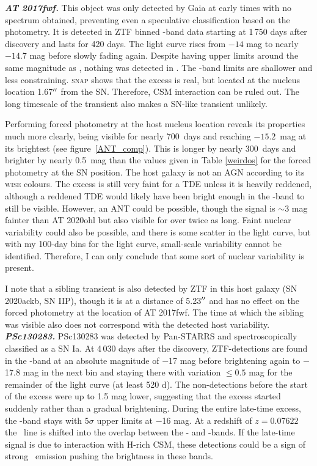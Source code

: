 \documentclass[a4paper,oneside,12pt, class=Latex/Classes/PhDthesisPSnPDF, crop=false]{standalone}
\begin{document}
\textit{\textbf{AT 2017fwf.}}
This object was only detected by Gaia at early times with no spectrum obtained, preventing even a speculative classification based on the photometry. It is detected in ZTF binned \ztfr-band data starting at 1\,750 days after discovery and lasts for 420 days. The light curve rises from $-14$ mag to nearly $-14.7$ mag before slowly fading again. Despite having upper limits around the same magnitude as \ztfr, nothing was detected in \ztfg. The \ztfi-band limits are shallower and less constraining. \textsc{snap} shows that the excess is real, but located at the nucleus location 1.67$^{\prime\prime}$ from the SN. Therefore, CSM interaction can be ruled out. The long timescale of the transient also makes a SN-like transient unlikely.

Performing forced photometry at the host nucleus location reveals its properties much more clearly, being visible for nearly 700~days and reaching $-15.2$~mag at its brightest (see figure~\ref{ANT_comp}). This is longer by nearly 300~days and brighter by nearly 0.5~mag than the values given in Table \ref{weirdos} for the forced photometry at the SN position. The host galaxy is not an AGN according to its \textsc{wise} colours. The excess is still very faint for a TDE unless it is heavily reddened, although a reddened TDE would likely have been bright enough in the \ztfi-band to still be visible. However, an ANT could be possible, though the signal is $\sim3$ mag fainter than AT 2020ohl but also visible for over twice as long. Faint nuclear variability could also be possible, and there is some scatter in the light curve, but with my 100-day bins for the light curve, small-scale variability cannot be identified. Therefore, I can only conclude that some sort of nuclear variability is present.

I note that a sibling transient is also detected by ZTF in this host galaxy (SN 2020ackb, SN IIP), though it is at a distance of 5.23$^{\prime\prime}$ and has no effect on the forced photometry at the location of AT 2017fwf. The time at which the sibling was visible also does not correspond with the detected host variability.\\


\textit{\textbf{PSc130283.}}
PSc130283 was detected by Pan-STARRS and spectroscopically classified as a SN Ia. At 4\,030 days after the discovery, ZTF-detections are found in the \ztfr-band at an absolute magnitude of $-$17 mag before brightening again to $-$17.8 mag in the next bin and staying there with variation $\leq 0.5$ mag for the remainder of the light curve (at least 520 d). The non-detections before the start of the excess were up to 1.5 mag lower, suggesting that the excess started suddenly rather than a gradual brightening. During the entire late-time excess, the \ztfg-band stays with $5\sigma$ upper limits at $-$16 mag. At a redshift of $z=0.07622$ the \Halpha\ line is shifted into the overlap between the \ztfr- and \ztfi-bands. If the late-time signal is due to interaction with H-rich CSM, these detections could be a sign of strong \Halpha\ emission pushing the brightness in these bands.
\end{document}
